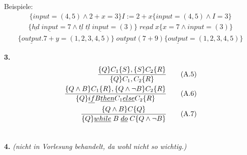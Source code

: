 \begin{compactitem}
		Beispiele:
		\begin{align*}
		\{input=(4,5)\land2+x=3\} I:=2+x \{input=(4,5)\land I=3\}
		\end{align*}
		\begin{align*}
		\{\underline{hd}\;\underline{input}=7 \land \underline{tl}\; \underline{tl}\;\underline{input}=(3) \}\;\underline{read}\; x \{x=7 \land input=(3)\}
		\end{align*}
		\begin{align*}
		\{\underline{output}.7+y=(1,2,3,4,5)\}\; \underline{output} (7+9) \{\underline{output} = (1,2,3,4,5)\}
		\end{align*}
	\item[\textbf{3.}]
	\begin{align}
	\frac{\{Q\}C_1\{S\},\{S\}C_2\{R\}}{\{Q\}C_1,C_2\{R\}}\tag{A.5}\\
	\frac{\{Q\land B\}C_1\{R\},\{Q\land \lnot B\}C_2\{R\}}{\{Q\}\underline{if}B\underline{then}C_1\underline{else}C_2\{R\}}\tag{A.6}\\
	\frac{\{Q\land B\}C\{Q\}}{\{Q\}\underline{while}\;B\;\underline{do}\;C\{Q\land \lnot B\}}\tag{A.7}\\
	\notag
	\end{align}
	\item[\textbf{4.}] \emph{(nicht in Vorlesung behandelt, da wohl nicht so wichtig.)}
\end{compactitem}
